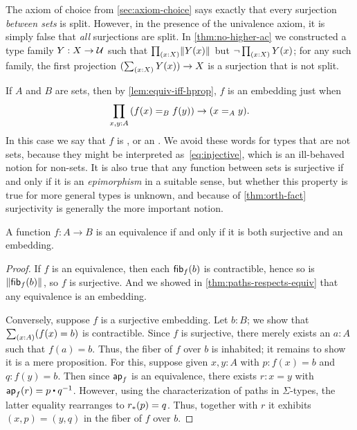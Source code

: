 The axiom of choice from \cref{sec:axiom-choice} says exactly that every surjection \emph{between sets} is split.
However, in the presence of the univalence axiom, it is simply false that \emph{all} surjections are split.
In \cref{thm:no-higher-ac} we constructed a type family $Y:X\to \mathcal{U}$ such that $\prd{x:X} \brck{Y(x)}$ but $\neg \prd{x:X} Y(x)$;
for any such family, the first projection $(\sm{x:X} Y(x)) \to X$ is a surjection that is not split.

If $A$ and $B$ are sets, then by \cref{lem:equiv-iff-hprop}, $f$ is an embedding just when
\begin{equation}
  \prd{x,y:A} (\id[B]{f(x)}{f(y)}) \to (\id[A]xy).\label{eq:injective}
\end{equation}
In this case we say that $f$ is ,
%
%
or an .
%
We avoid these words for types that are not sets, because they might be interpreted as~\autoref{eq:injective}, which is an ill-behaved notion for non-sets.
It is also true that any function between sets is surjective if and only if it is an \emph{epimorphism} in a suitable sense, but whether this property is true for more general types is unknown, and because of \autoref{thm:orth-fact} surjectivity 
is generally the more important notion.

\begin{thm}\label{thm:mono-surj-equiv}
  A function $f:A\to B$ is an equivalence if and only if it is both surjective and an embedding.
\end{thm}
\begin{proof}
  If $f$ is an equivalence, then each ${\mathsf{fib}}_{f}(b)$ is contractible, hence so is $\mathopen{}\left\Vert {\mathsf{fib}}_{f}(b)\right\Vert_{}\mathclose{}$, so $f$ is surjective.
  And we showed in \cref{thm:paths-respects-equiv} that any equivalence is an embedding.

  Conversely, suppose $f$ is a surjective embedding.
  Let $b:B$; we show that $\sm{x:A}(f(x)=b)$ is contractible.
  Since $f$ is surjective, there merely exists an $a:A$ such that $f(a)=b$.
  Thus, the fiber of $f$ over $b$ is inhabited; it remains to show it is a mere proposition.
  For this, suppose given $x,y:A$ with $p:f(x)=b$ and $q:f(y)=b$.
  Then since $\mathsf{ap}_{f}$ is an equivalence, there exists $r:x=y$ with $\apfunc f (r) = p \ct \opp q$.
  However, using the characterization of paths in $\Sigma$-types, the latter equality rearranges to ${r}_{*}\mathopen{}\left({p}\right)\mathclose{} = q$.
  Thus, together with $r$ it exhibits $(x,p) = (y,q)$ in the fiber of $f$ over $b$.
\end{proof}

